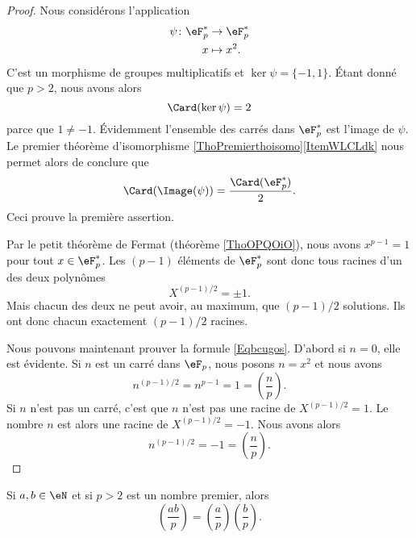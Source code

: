 \begin{proof}
    Nous considérons l'application 
    \begin{equation}
        \begin{aligned}
            \psi\colon \eF^*_p&\to \eF^*_p \\
            x&\mapsto x^2. 
        \end{aligned}
    \end{equation}
    C'est un morphisme de groupes multiplicatifs et \( \ker\psi=\{ -1,1 \}\). Étant donné que \( p>2\), nous avons alors
    \begin{equation}
        \Card(\ker\psi)=2
    \end{equation}
    parce que \( 1\neq -1\). Évidemment l'ensemble des carrés dans \( \eF^*_p\) est l'image de \( \psi\). Le premier théorème d'isomorphisme \ref{ThoPremierthoisomo}\ref{ItemWLCLdk} nous permet alors de conclure que
    \begin{equation}
        \Card(\Image(\psi))=\frac{ \Card(\eF^*_p) }{2}.
    \end{equation}
    Ceci prouve la première assertion.

    Par le petit théorème de Fermat (théorème \ref{ThoOPQOiO}), nous avons \( x^{p-1}=1\) pour tout \( x\in \eF^*_p\). Les \( (p-1)\) éléments de \( \eF^*_p\) sont donc tous racines d'un des deux polynômes
    \begin{equation}
        X^{(p-1)/2}=\pm 1.
    \end{equation}
    Mais chacun des deux ne peut avoir, au maximum, que \( (p-1)/2\) solutions. Ils ont donc chacun exactement \( (p-1)/2\) racines.

    Nous pouvons maintenant prouver la formule \eqref{Eqbcugos}. D'abord si \( n=0\), elle est évidente. Si \( n\) est un carré dans \( \eF_p\), nous posons \( n=x^2\) et nous avons
    \begin{equation}
        n^{(p-1)/2}=n^{p-1}=1=\left(\frac{n}{p}\right).
    \end{equation}
    Si \( n\) n'est pas un carré, c'est que \( n\) n'est pas une racine de \( X^{(p-1)/2}=1\). Le nombre \( n\) est alors une racine de \( X^{(p-1)/2}=-1\). Nous avons alors
    \begin{equation}
        n^{(p-1)/2}=-1=\left(\frac{n}{p}\right).
    \end{equation}
\end{proof}

\begin{corollary}   \label{CoruJosNz}
    Si \( a,b\in \eN\) et si \( p>2\) est un nombre premier, alors
    \begin{equation}
        \left(\frac{ab}{p}\right)=\left(\frac{a}{p}\right)\left(\frac{b}{p}\right).
    \end{equation}
\end{corollary}

